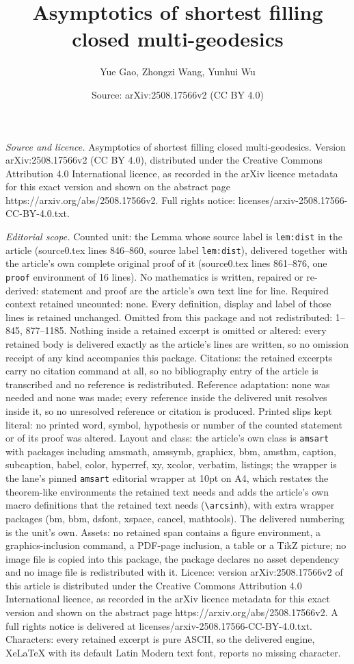 \documentclass[10pt,a4paper]{amsart}
\title[Asymptotics of shortest filling closed multi-geodesics]{Asymptotics of shortest filling closed multi-geodesics}
\author{Yue Gao, Zhongzi Wang, Yunhui Wu}
\date{Source: arXiv:2508.17566v2 (CC BY 4.0)}
\begin{document}
\maketitle

\noindent\emph{Source and licence.} Asymptotics of shortest filling closed multi-geodesics. Version arXiv:2508.17566v2 (CC BY 4.0), distributed under the Creative Commons Attribution 4.0 International licence, as recorded in the arXiv licence metadata for this exact version and shown on the abstract page https://arxiv.org/abs/2508.17566v2. Full rights notice: licenses/arxiv-2508.17566-CC-BY-4.0.txt.\par\smallskip

\noindent\textit{Editorial scope.} Counted unit: the Lemma whose source label is \texttt{lem:dist} in the article (source0.tex lines 846--860, source label \texttt{lem:dist}), delivered together with the article's own complete original proof of it (source0.tex lines 861--876, one \texttt{proof} environment of 16 lines). No mathematics is written, repaired or re-derived: statement and proof are the article's own text line for line. Required context retained uncounted: none. Every definition, display and label of those lines is retained unchanged. Omitted from this package and not redistributed: 1--845, 877--1185. Nothing inside a retained excerpt is omitted or altered: every retained body is delivered exactly as the article's lines are written, so no omission receipt of any kind accompanies this package. Citations: the retained excerpts carry no citation command at all, so no bibliography entry of the article is transcribed and no reference is redistributed. Reference adaptation: none was needed and none was made; every reference inside the delivered unit resolves inside it, so no unresolved reference or citation is produced. Printed slips kept literal: no printed word, symbol, hypothesis or number of the counted statement or of its proof was altered. Layout and class: the article's own class is \texttt{amsart} with packages including amsmath, amssymb, graphicx, bbm, amsthm, caption, subcaption, babel, color, hyperref, xy, xcolor, verbatim, listings; the wrapper is the lane's pinned \texttt{amsart} editorial wrapper at 10pt on A4, which restates the theorem-like environments the retained text needs and adds the article's own macro definitions that the retained text needs (\texttt{\textbackslash arcsinh}), with extra wrapper packages (bm, bbm, dsfont, xspace, cancel, mathtools). The delivered numbering is the unit's own. Assets: no retained span contains a figure environment, a graphics-inclusion command, a PDF-page inclusion, a table or a TikZ picture; no image file is copied into this package, the package declares no asset dependency and no image file is redistributed with it. Licence: version arXiv:2508.17566v2 of this article is distributed under the Creative Commons Attribution 4.0 International licence, as recorded in the arXiv licence metadata for this exact version and shown on the abstract page https://arxiv.org/abs/2508.17566v2. A full rights notice is delivered at licenses/arxiv-2508.17566-CC-BY-4.0.txt. Characters: every retained excerpt is pure ASCII, so the delivered engine, XeLaTeX with its default Latin Modern text font, reports no missing character.
\end{document}
